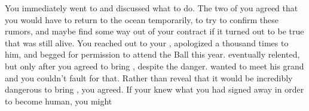 \documentclass[char]{NeptuneBall}
\begin{document}
You immediately went to \cEric{} and discussed what to do. The two of you agreed that you would have to return to the ocean temporarily, to try to confirm these rumors, and maybe find some way out of your contract if it turned out to be true that \cWitch{} was still alive. You reached out to your \cKing{\parent}, apologized a thousand times to him, and begged for permission to attend the \cExExKing{} Ball this year. \cKing{\They} eventually relented, but only after you agreed to bring \cWillow{}, despite the danger. \cKing{} wanted to meet his grand\cWillow{\offspring} and you couldn't fault \cKing{\them} for that. Rather than reveal that it would be incredibly dangerous to bring \cWillow{}, you agreed. If your \cKing{\parent} knew what you had signed away in order to become human, you might 
\end{document}
